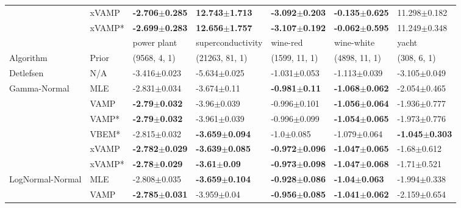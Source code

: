 \begin{tabular}{lllllll}
                 & xVAMP &  \textbf{-2.706$\pm$0.285} &  \textbf{12.743$\pm$1.713} &  \textbf{-3.092$\pm$0.203} &  \textbf{-0.135$\pm$0.625} &           11.298$\pm$0.182 \\
                 & xVAMP* &  \textbf{-2.699$\pm$0.283} &  \textbf{12.656$\pm$1.757} &  \textbf{-3.107$\pm$0.192} &  \textbf{-0.062$\pm$0.595} &           11.249$\pm$0.348 \\
\midrule
                 &        &                power plant &          superconductivity &                   wine-red &                 wine-white &                      yacht \\
Algorithm & Prior& (9568, 4, 1)& (21263, 81, 1)& (1599, 11, 1)& (4898, 11, 1)& (308, 6, 1)\\
\midrule
Detlefsen & N/A &           -3.416$\pm$0.023 &           -5.634$\pm$0.025 &           -1.031$\pm$0.053 &           -1.113$\pm$0.039 &           -3.105$\pm$0.049 \\
Gamma-Normal & MLE &           -2.831$\pm$0.034 &            -3.674$\pm$0.11 &   \textbf{-0.981$\pm$0.11} &  \textbf{-1.068$\pm$0.062} &           -2.054$\pm$0.465 \\
                 & VAMP &   \textbf{-2.79$\pm$0.032} &            -3.96$\pm$0.039 &           -0.996$\pm$0.101 &  \textbf{-1.056$\pm$0.064} &           -1.936$\pm$0.777 \\
                 & VAMP* &   \textbf{-2.79$\pm$0.032} &           -3.961$\pm$0.039 &           -0.996$\pm$0.099 &  \textbf{-1.054$\pm$0.065} &           -1.973$\pm$0.776 \\
                 & VBEM* &           -2.815$\pm$0.032 &  \textbf{-3.659$\pm$0.094} &             -1.0$\pm$0.085 &           -1.079$\pm$0.064 &  \textbf{-1.045$\pm$0.303} \\
                 & xVAMP &  \textbf{-2.782$\pm$0.029} &  \textbf{-3.639$\pm$0.085} &  \textbf{-0.972$\pm$0.096} &  \textbf{-1.047$\pm$0.065} &            -1.68$\pm$0.612 \\
                 & xVAMP* &   \textbf{-2.78$\pm$0.029} &    \textbf{-3.61$\pm$0.09} &  \textbf{-0.973$\pm$0.098} &  \textbf{-1.047$\pm$0.068} &            -1.71$\pm$0.521 \\
LogNormal-Normal & MLE &           -2.808$\pm$0.035 &  \textbf{-3.659$\pm$0.104} &  \textbf{-0.928$\pm$0.086} &   \textbf{-1.04$\pm$0.063} &           -1.994$\pm$0.338 \\
                 & VAMP &  \textbf{-2.785$\pm$0.031} &            -3.959$\pm$0.04 &  \textbf{-0.956$\pm$0.085} &  \textbf{-1.041$\pm$0.062} &           -2.159$\pm$0.654 \\

\end{tabular}
